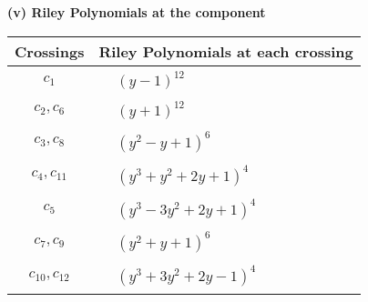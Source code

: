 \documentclass[1p]{elsarticle_modified}
\theoremstyle{definition}
\begin{document}
\newpage\renewcommand{\arraystretch}{1}
\flushleft \textbf{(v) Riley Polynomials at the component}\newline \\
\begin{tabular}{m{50pt}|m{274pt}}
Crossings & \hspace{64pt}Riley Polynomials at each crossing \\
\hline $$\begin{aligned}c_{1}\end{aligned}$$&$\begin{aligned}
&(y-1)^{12}
\end{aligned}$\\
\hline $$\begin{aligned}c_{2},c_{6}\end{aligned}$$&$\begin{aligned}
&(y+1)^{12}
\end{aligned}$\\
\hline $$\begin{aligned}c_{3},c_{8}\end{aligned}$$&$\begin{aligned}
&(y^2- y+1)^6
\end{aligned}$\\
\hline $$\begin{aligned}c_{4},c_{11}\end{aligned}$$&$\begin{aligned}
&(y^3+y^2+2 y+1)^4
\end{aligned}$\\
\hline $$\begin{aligned}c_{5}\end{aligned}$$&$\begin{aligned}
&(y^3-3 y^2+2 y+1)^4
\end{aligned}$\\
\hline $$\begin{aligned}c_{7},c_{9}\end{aligned}$$&$\begin{aligned}
&(y^2+y+1)^6
\end{aligned}$\\
\hline $$\begin{aligned}c_{10},c_{12}\end{aligned}$$&$\begin{aligned}
&(y^3+3 y^2+2 y-1)^4
\end{aligned}$\\
\hline
\end{tabular}\\~\\
\end{document}
